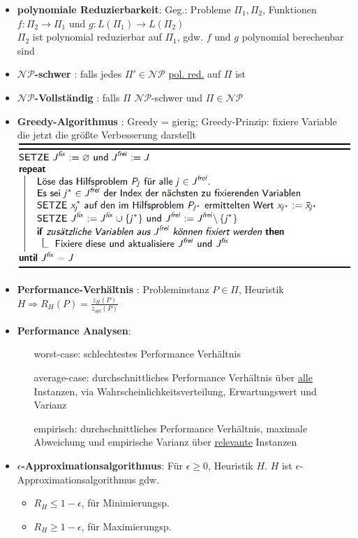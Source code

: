 \documentclass[12pt]{article}
\begin{document}
\begin{itemize}
			\item \textbf{polynomiale Reduzierbarkeit}\label{polyRed}: 
				Geg.: Probleme $\Pi_1, \Pi_2$, Funktionen $f:\Pi_2\rightarrow\Pi_1$ und $g:L(\Pi_1)\rightarrow L(\Pi_2)$\\
				$\Pi_2$ ist polynomial reduzierbar auf $\Pi_1$, gdw. $f$ und $g$ polynomial berechenbar sind
			\item \textbf{$\mathcal{NP}$-schwer} \label{NPschwer}: falls jedes $\Pi'\in\mathcal{NP}$ \hyperref[polyRed]{pol. red.} auf $\Pi$ ist
			\item \textbf{$\mathcal{NP}$-Vollständig} \label{NPvoll}: falls $\Pi$ $\mathcal{NP}$-schwer und $\Pi\in\mathcal{NP}$
			\item \textbf{Greedy-Algorithmus} \label{greedy}: Greedy = gierig; Greedy-Prinzip: fixiere Variable die jetzt die größte Verbesserung darstellt\\
				\includegraphics[scale =0.6]{AllgGreedy}
			\item\textbf{Performance-Verhältnis} \label{Performance Verhaeltnis}: Probleminstanz $P\in \Pi$, Heuristik \\ $H \Rightarrow 		R_H(P)=\frac{z_H(P)}{z_{opt}(P)}$ 
			\item \textbf{Performance Analysen}\label{Performance Analyse}: \\
				\begin{itemize}
					\item[worst-case:] schlechtestes Performance Verhältnis
					\item[average-case:] durchschnittliches Performance Verhältnis über \underline{alle} Instanzen, via Wahrscheinlichkeitsverteilung, Erwartungswert und Varianz
					\item[empirisch:] durchschnittliches Performance Verhältnis, maximale Abweichung und empirische Varianz über \underline{relevante} Instanzen
				\end{itemize}
			\item \textbf{$\epsilon$-Approximationsalgorithmus}\label{eApproxAlgo}: Für $\epsilon\ge 0$, Heuristik $H$. $H$ ist $\epsilon$-Approximationsalgorithmus gdw.
				\begin{itemize}
					\item $R_H \le 1- \epsilon$, für Minimierungsp.
					\item $R_H \ge 1- \epsilon$, für Maximierungsp.
				\end{itemize}
			
		\end{itemize}
	
\end{document}

